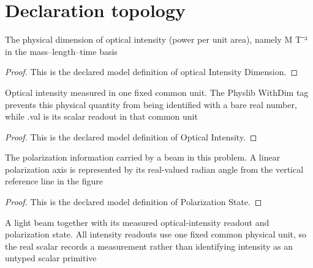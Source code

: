 \section{Declaration topology}
\begin{definition}
  \label{def:physics:phyx-mini-0093:phyxminiproblems-problemphyxmini0093-opticalintensitydimension}
  The physical dimension of optical intensity (power per unit area), namely M T⁻³ in the mass--length--time basis
\end{definition}
\begin{proof}
  This is the declared model definition of optical Intensity Dimension.
\end{proof}
\begin{definition}
  \label{def:physics:phyx-mini-0093:phyxminiproblems-problemphyxmini0093-opticalintensity}
  Optical intensity measured in one fixed common unit. The Physlib WithDim tag prevents this physical quantity from being identified with a bare real number, while .val is its scalar readout in that common unit
\end{definition}
\begin{proof}
  This is the declared model definition of Optical Intensity.
\end{proof}
\begin{definition}
  \label{def:physics:phyx-mini-0093:phyxminiproblems-problemphyxmini0093-polarizationstate}
  The polarization information carried by a beam in this problem. A linear polarization axis is represented by its real-valued radian angle from the vertical reference line in the figure
\end{definition}
\begin{proof}
  This is the declared model definition of Polarization State.
\end{proof}
\begin{definition}
  \label{def:physics:phyx-mini-0093:phyxminiproblems-problemphyxmini0093-lightbeam}
  A light beam together with its measured optical-intensity readout and polarization state. All intensity readouts use one fixed common physical unit, so the real scalar records a measurement rather than identifying intensity as an untyped scalar primitive
\end{definition}
